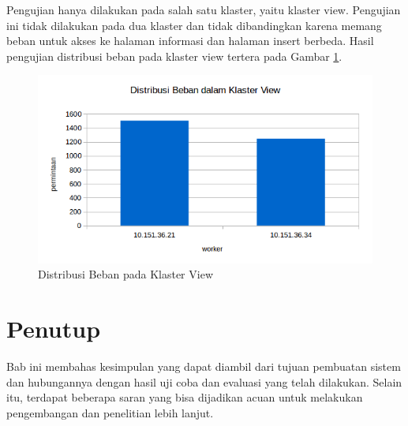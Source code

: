 \documentclass{ta-its}
\begin{document}
					Pengujian hanya dilakukan pada salah satu klaster, yaitu klaster view. Pengujian ini tidak dilakukan pada dua klaster dan tidak dibandingkan karena memang beban untuk akses ke halaman informasi dan halaman insert berbeda. Hasil pengujian distribusi beban pada klaster view tertera pada Gambar \ref{gambarDistribusi}.
					
					\begin{figure}[h] 
						\centering
						\includegraphics[width=0.8\linewidth]{contoh_img/distribusi}
						\caption{Distribusi Beban pada Klaster View}
						\label{gambarDistribusi}
					\end{figure}
					
		\chapter{Penutup}
			Bab ini membahas kesimpulan yang dapat diambil dari tujuan pembuatan sistem dan hubungannya dengan hasil uji coba dan evaluasi yang telah dilakukan. Selain itu, terdapat beberapa saran yang bisa dijadikan acuan untuk melakukan pengembangan dan penelitian lebih lanjut.
			
\end{document}
